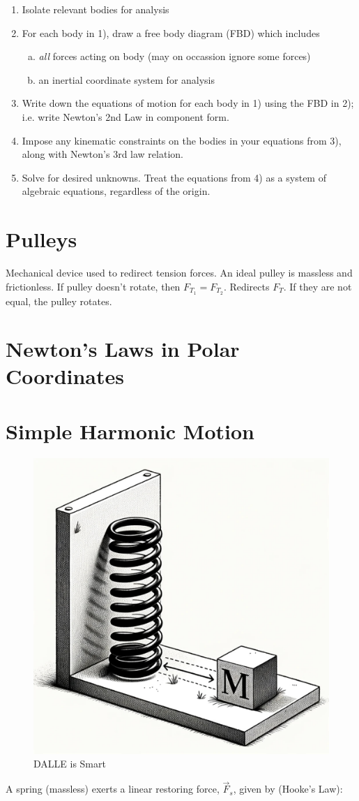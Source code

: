 \begin{enumerate}[1)]
	\item Isolate relevant bodies for analysis
	\item For each body in 1), draw a free body diagram (FBD) which includes
	
	\begin{enumerate}[(a)]
		\item \textit{all} forces acting on body (may on occassion ignore some forces)
		\item an inertial coordinate system for analysis
	\end{enumerate}
	\item Write down the equations of motion for each body in 1) using the FBD in 2); i.e. write Newton's 2nd Law in component form.
	\item Impose any kinematic constraints on the bodies in your equations from 3), along with Newton's 3rd law relation.
	\item Solve for desired unknowns. Treat the equations from 4) as a system of algebraic equations, regardless of the origin.
\end{enumerate}

\section{Pulleys}

Mechanical device used to redirect tension forces. An ideal pulley is massless and frictionless. If pulley doesn't rotate, then $F_{T_1} = F_{T_2}$. Redirects $F_T$. If they are not equal, the pulley rotates.

\section{Newton's Laws in Polar Coordinates}

\section{Simple Harmonic Motion}

\begin{figure}[H]
	\centering
	\includegraphics[width=0.5\linewidth]{assets/spring2wall.jpg}
	\caption{DALLE is Smart}
\end{figure}
A spring (massless) exerts a linear restoring force, $\vec F_s$, given by (Hooke's Law):

